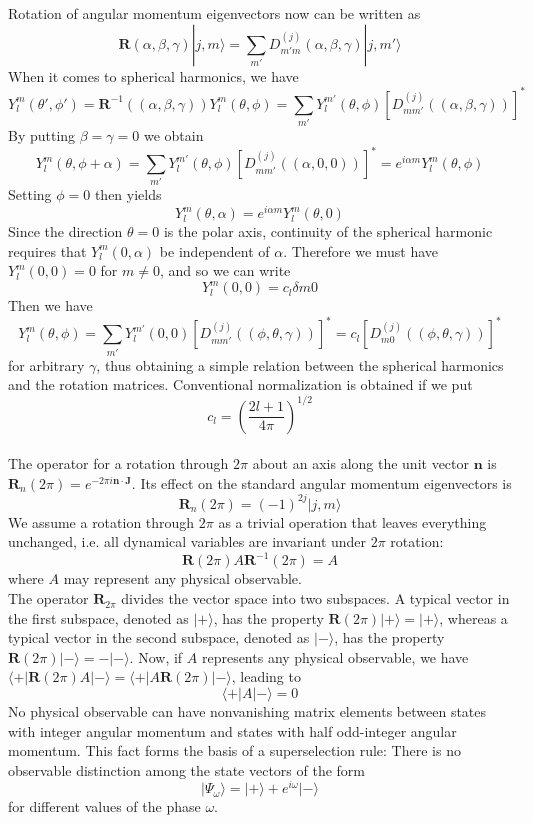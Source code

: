 Rotation of angular momentum eigenvectors now can be written as
\[\bm{R}(\alpha,\beta,\gamma)|j,m\rangle = \sum_{m'} D_{m'm}^{(j)}(\alpha,\beta,\gamma) |j,m'\rangle\]
When it comes to spherical harmonics, we have
\[Y_l^m(\theta',\phi') = \bm{R}^{-1}((\alpha,\beta,\gamma)) Y_l^m(\theta,\phi) = \sum_{m'} Y_{l}^{m'}(\theta,\phi) [D_{mm'}^{(j)}((\alpha,\beta,\gamma))]^*\]
By putting $\beta = \gamma = 0$ we obtain
\[Y_l^m(\theta,\phi+\alpha) = \sum_{m'} Y_{l}^{m'}(\theta,\phi) [D_{mm'}^{(j)}((\alpha,0,0))]^* = e^{i\alpha m} Y_{l}^{m}(\theta,\phi)\]
Setting $\phi=0$ then yields
\[Y_l^m(\theta,\alpha) = e^{i\alpha m} Y_{l}^{m}(\theta,0)\]
Since the direction $\theta = 0$ is the polar axis, continuity of the spherical harmonic requires that $Y_l^m(0,\alpha)$ be independent of $\alpha$. Therefore we must
have $Y_l^m(0,0) = 0$ for $m \neq 0$, and so we can write\\
\[Y_{l}^{m}(0,0) = c_{l}\delta{m0}\]
Then we have
\[Y_l^m(\theta,\phi) = \sum_{m'} Y_{l}^{m'}(0,0) [D_{mm'}^{(j)}((\phi,\theta,\gamma))]^* = c_l [D_{m0}^{(j)}((\phi,\theta,\gamma))]^*\]
for arbitrary $\gamma$, thus obtaining a simple relation between the spherical harmonics and the rotation matrices. Conventional normalization is obtained if we put
\[c_l = \left( \frac{2l+1}{4\pi} \right) ^{1/2}\]
\\
The operator for a rotation through $2\pi$ about an axis
along the unit vector $\bm{n}$ is $\bm{R}_n(2\pi) = e^{-2\pi i\bm{n}\cdot\bm{J}}$. Its effect on the standard angular momentum eigenvectors is
\[\bm{R}_n(2\pi) = (-1)^{2j}|j,m\rangle \]
We assume a rotation through $2\pi$ as a trivial operation that leaves everything unchanged, i.e. all dynamical variables are invariant under $2\pi$ rotation:
\[\bm{R}(2\pi) A \bm{R}^{-1}(2\pi) = A\]
where $A$ may represent any physical observable. \\
The operator $\bm{R}_{2\pi}$ divides the vector space into two subspaces. A typical vector in the first subspace,
denoted as $|+\rangle$, has the property $\bm{R}(2\pi)|+\rangle = |+\rangle$, whereas a typical vector in the second subspace, denoted as $|-\rangle$, has the property $\bm{R}(2\pi)|-\rangle = -|-\rangle$. Now, if $A$ represents any physical observable, we have $\langle + | \bm{R}(2\pi) A| - \rangle = \langle + | A\bm{R}(2\pi)| - \rangle$, leading to 
\[\langle + | A | - \rangle = 0\] 
No physical observable can have nonvanishing matrix elements between states with integer angular momentum and states with half odd-integer angular momentum. This fact forms the basis of a superselection rule: There is no observable distinction among the state vectors of the form\\
\[|\Psi_{\omega}\rangle = |+\rangle + e^{i\omega}|-\rangle\]
for different values of the phase $\omega$.

